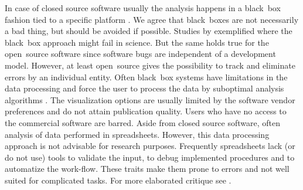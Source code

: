 In case of closed source software usually the analysis happens in a 
black~box fashion tied to a specific platform \citep{roediger_RJ_2013, 
Spiess_2014}. We agree that black~boxes are not necessarily a bad thing, but 
should be avoided if possible. Studies by \citet{mccullough_2008, Almiron_2010, 
Duran_2014} exemplified where the black~box approach might fail in science. But 
the same holds true for the open~source software since software bugs are 
independent of a development model. However, at least open~source gives the 
possibility to track and eliminate  errors by an individual entity. Often 
black~box systems have limitations in the data processing and force the user to 
process the data by suboptimal analysis algorithms \citep{ruijter_2013}. The 
visualization options are usually limited by the software vendor preferences and 
do not attain publication quality. Users who have no access to the commercial 
software are barred. Aside from closed source software, often analysis of data 
performed in spreadsheets. However, this data processing approach is not 
advisable for research purposes. Frequently spreadsheets  lack (or do not use) 
tools to validate the input, to debug implemented procedures and to automatize 
the work-flow. These traits make them prone to errors and not well suited for 
complicated tasks. For more elaborated critique see \citet{mccullough_2008, 
burns_2014}.


